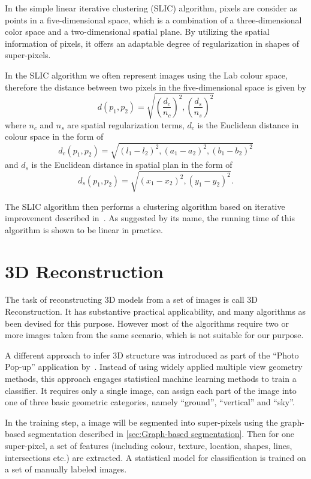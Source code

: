 In the simple linear iterative clustering (SLIC) algorithm, pixels are consider as points in a five-dimensional space, which is a combination of a three-dimensional color space and a two-dimensional spatial plane. By utilizing the spatial information of pixels, it offers an adaptable degree of regularization in shapes of super-pixels.

In the SLIC algorithm we often represent images using the Lab colour space, therefore the distance between two pixels in the five-dimensional space is given by
\begin{equation}
	d(p_1,p_2) = \sqrt{(\frac{d_c}{n_c})^2,(\frac{d_s}{n_s})^2}
\end{equation}
where $n_c$ and $n_s$ are spatial regularization terms, $d_c$ is the Euclidean distance in colour space in the form of 
\begin{equation}
	d_c(p_1,p_2) = \sqrt{(l_1-l_2)^2,(a_1-a_2)^2,(b_1-b_2)^2}
\end{equation}
and $d_s$ is the Euclidean distance in spatial plan in the form of
\begin{equation}
	d_s(p_1,p_2) = \sqrt{(x_1-x_2)^2,(y_1-y_2)^2}.
\end{equation}

The SLIC algorithm then performs a clustering algorithm based on iterative improvement described in~\cite{achanta2012slic}. As suggested by its name, the running time of this algorithm is shown to be linear in practice.

\section{3D Reconstruction}
\label{sec:3D Reconstruction}
The task of reconstructing 3D models from a set of images is call 3D Reconstruction. It has substantive practical applicability, and many algorithms as been devised for this purpose. However most of the algorithms require two or more images taken from the same scenario, which is not suitable for our purpose.

A different approach to infer 3D structure was introduced as part of the  ``Photo Pop-up'' application by~\cite{hoiem2005automatic}. Instead of using widely applied multiple view geometry methods, this approach engages statistical machine learning methods to train a classifier. It requires only a single image, can assign each part of the image into one of three basic geometric categories, namely ``ground'', ``vertical'' and ``sky''. 

In the training step, a image will be segmented into super-pixels using the graph-based segmentation described in \ref{sec:Graph-based segmentation}. Then for one super-pixel, a set of features (including colour, texture, location, shapes, lines, intersections etc.) are extracted. A statistical model for classification is trained on a set of manually labeled images. 

